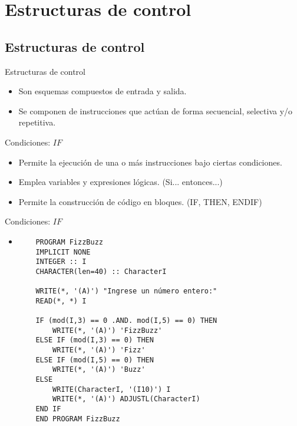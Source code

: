 
\section{Estructuras de control}  


\subsection{Estructuras de control}

\begin{frame}[fragile]{Estructuras de control} 
 \begin{itemize}[<+(1)->]
  \item Son esquemas compuestos de entrada y salida.
  \item Se componen de instrucciones que actúan de forma secuencial, selectiva y/o repetitiva.
 \end{itemize}
\end{frame}


\begin{frame}[fragile]{Condiciones: $IF$ } 
 \begin{itemize}[<+(1)->]
  \item Permite la ejecución de una o más instrucciones bajo ciertas condiciones. 
  \item Emplea variables y expresiones lógicas. (Si... entonces...) 
  \item Permite la construcción de código en bloques. (IF, THEN, ENDIF)
 \end{itemize}
\end{frame}


\begin{frame}[fragile]{Condiciones: $IF$ } 
 \begin{itemize}[<+(0)->]
  \item []  
  \begin{verbatim}
    PROGRAM FizzBuzz  
    IMPLICIT NONE
    INTEGER :: I
    CHARACTER(len=40) :: CharacterI

    WRITE(*, '(A)') "Ingrese un número entero:"
    READ(*, *) I

    IF (mod(I,3) == 0 .AND. mod(I,5) == 0) THEN
        WRITE(*, '(A)') 'FizzBuzz'
    ELSE IF (mod(I,3) == 0) THEN
        WRITE(*, '(A)') 'Fizz'
    ELSE IF (mod(I,5) == 0) THEN
        WRITE(*, '(A)') 'Buzz'
    ELSE
        WRITE(CharacterI, '(I10)') I
        WRITE(*, '(A)') ADJUSTL(CharacterI)
    END IF
    END PROGRAM FizzBuzz
  \end{verbatim}
 \end{itemize}
\end{frame}